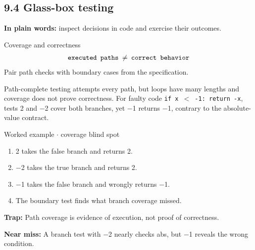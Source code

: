 \documentclass[11pt]{article}
\begin{document}
\begin{keepsection}
\section{9.4 Glass-box testing}

\begin{plainbox}\textbf{In plain words:} inspect decisions in code and exercise their outcomes.\end{plainbox}

\begin{equationcard}{Coverage and correctness}
\[ \begin{gathered} \texttt{executed paths \ensuremath{\neq} correct behavior} \end{gathered} \]
{\small Pair path checks with boundary cases from the specification.}
\end{equationcard}

Path-complete testing attempts every path, but loops have many lengths and coverage does not prove correctness. For faulty code \texttt{if x \ensuremath{<} -1: return -x}, tests 2 and \ensuremath{-}2 cover both branches, yet \ensuremath{-}1 returns \ensuremath{-}1, contrary to the absolute-value contract.

\begin{workedbox}{Worked example \ensuremath{\cdot} coverage blind spot}
\begin{enumerate}
\item 2 takes the false branch and returns 2.
\item \ensuremath{-}2 takes the true branch and returns 2.
\item \ensuremath{-}1 takes the false branch and wrongly returns \ensuremath{-}1.
\item The boundary test finds what branch coverage missed.
\end{enumerate}
\end{workedbox}

\begin{notebox}\textbf{Trap:} Path coverage is evidence of execution, not proof of correctness.\end{notebox}

\begin{notebox}\textbf{Near miss:} A branch test with \ensuremath{-}2 nearly checks abs, but \ensuremath{-}1 reveals the wrong condition.\end{notebox}


\end{keepsection}
\end{document}
